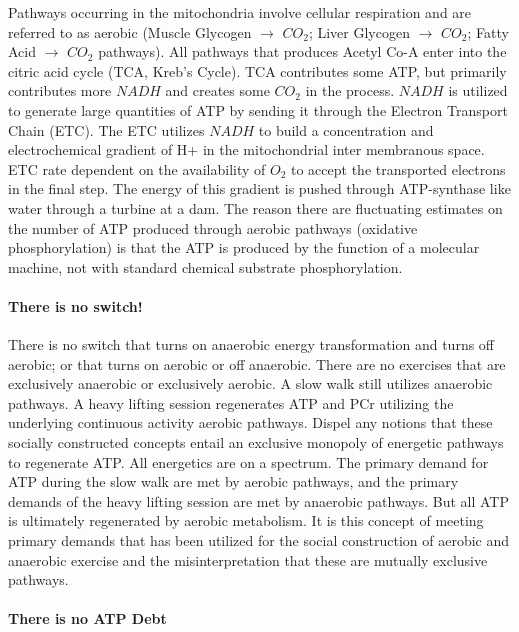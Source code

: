 Pathways occurring in the mitochondria involve cellular respiration and are referred to as aerobic (Muscle Glycogen $\rightarrow$ $CO_2$; Liver Glycogen $\rightarrow$ $CO_2$; Fatty Acid $\rightarrow$ $CO_2$ pathways). All pathways that produces Acetyl Co-A enter into the citric acid cycle (TCA, Kreb's Cycle). TCA contributes some ATP, but primarily contributes more $NADH$ and creates some $CO_2$ in the process. $NADH$ is utilized to generate large quantities of ATP by sending it through the Electron Transport Chain (ETC). The ETC utilizes $NADH$ to build a concentration and electrochemical gradient of H+ in the mitochondrial inter membranous space. ETC rate dependent on the availability of $O_2$ to accept the transported electrons in the final step. The energy of this gradient is pushed through ATP-synthase like water through a turbine at a dam. The reason there are fluctuating estimates on the number of ATP produced through aerobic pathways (oxidative phosphorylation) is that the ATP is produced by the function of a molecular machine, not with standard chemical substrate phosphorylation. 


\paragraph{There is no switch!}
There is no switch that turns on anaerobic energy transformation and turns off aerobic; or that turns on aerobic or off anaerobic. There are no exercises that are exclusively anaerobic or exclusively aerobic. A slow walk still utilizes anaerobic pathways. A heavy lifting session regenerates ATP and PCr utilizing the underlying continuous activity aerobic pathways. Dispel any notions that these socially constructed concepts entail an exclusive monopoly of energetic pathways to regenerate ATP. All energetics are on a spectrum. The primary demand for ATP during the slow walk are met by aerobic pathways, and the primary demands of the heavy lifting session are met by anaerobic pathways. But all ATP is ultimately regenerated by aerobic metabolism. It is this concept of meeting primary demands that has been utilized for the social construction of aerobic and anaerobic exercise and the misinterpretation that these are mutually exclusive pathways.

\paragraph{There is no ATP Debt}

